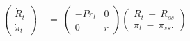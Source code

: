 \begin{align}
\begin{split}
    \begin{pmatrix}
        \dot{R}_{t} \\
        \dot{\pi}_{t}
    \end{pmatrix} \ 
    & = \ 
    \begin{pmatrix}
        -Pr_{t} & 0 \\
        0 & r
    \end{pmatrix}
    \begin{pmatrix}
        R_{t} \ - \ R_{ss} \\
        \pi_{t} \ - \ \pi_{ss}.
    \end{pmatrix}
\end{split}
\label{Equation:Social-Planners-Problem_Linearized-System-of-Equations-near-Steady-State}
\end{align}